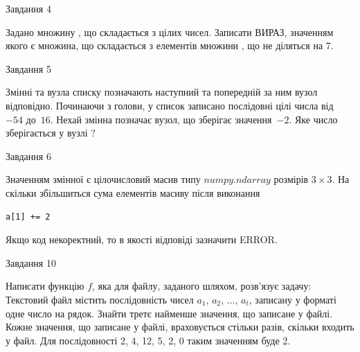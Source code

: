 \documentclass[12pt, ukrainian]{article}
\begin{document}
{\begin{minipage}[t]{8.0cm}
\end{minipage}


               
{\begin{center}Завдання {4}\end{center}}
\vspace{-4mm}
Задано множину , що складається з цілих чисел. Записати ВИРАЗ, значенням якого є множина, що складається  з елементів множини , що не діляться на 7.\par

\vspace{10mm}
               
{\begin{center}Завдання {5}\end{center}}
\vspace{-4mm}
Змінні  та  вузла списку позначають наступний та попередній за ним вузол відповідно. Починаючи з голови, у список записано послідовні цілі числа від~$-54$ до~$16$. Нехай змінна  позначає вузол, що зберігає значення~$-2$.
Яке число зберігається у вузлі  ?\par

               
{\begin{center}Завдання {6}\end{center}}
\vspace{-4mm}
Значенням змінної  є цілочисловий масив типу $numpy.ndarray$ розмірів $3{\times}3$. На скільки збільшиться сума елементів масиву  після виконання
\begin{verbatim}
a[1] += 2
\end{verbatim}


Якщо код некоректний, то в якості відповіді зазначити ERROR.\par

               
{\begin{center}Завдання {10}\end{center}}
\vspace{-4mm}

Написати функцію $f$, яка для файлу, заданого шляхом, розв’язує задачу:\\ Текстовий файл містить послідовність чисел $a_1$, $a_2$, $\ldots$, $a_t$, записану у форматі одне число на рядок. Знайти третє найменше значення, що записане у файлі. Кожне значення, що записане у файлі, враховується стільки разів, скільки входить у файл. Для послідовності 2, 4, 12, 5, 2, 0 таким значенням буде 2.

}
\end{document}
